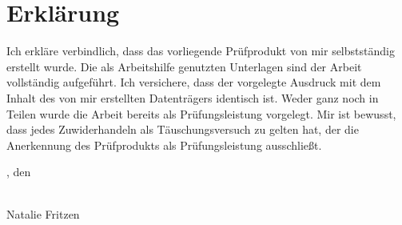 \chapter{Erklärung}\label{ch:erklaerung}

Ich erkläre verbindlich, dass das vorliegende Prüfprodukt von mir selbstständig erstellt wurde.
Die als Arbeitshilfe genutzten Unterlagen sind der Arbeit vollständig aufgeführt.
Ich versichere, dass der vorgelegte Ausdruck mit dem Inhalt des von mir erstellten Datenträgers identisch ist.
Weder ganz noch in Teilen wurde die Arbeit bereits als Prüfungsleistung vorgelegt.
Mir ist bewusst, dass jedes Zuwiderhandeln als Täuschungsversuch zu gelten hat, der die Anerkennung des Prüfprodukts als Prüfungsleistung ausschließt.

\begingroup
\setlength{\parindent}{0pt} %

\bigskip
\locationDocument, den \dateDocument
\bigskip
\bigskip

\newlength{\widthbox}
\settowidth{\widthbox}{\locationDocument, den \dateDocument}

\makebox[\widthbox]{\hrulefill}\\
Natalie Fritzen
\endgroup

